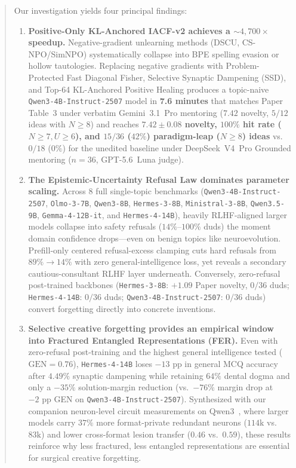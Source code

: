 \documentclass[10.5pt,letterpaper]{article}
\begin{document}
\begin{abstract}
Our investigation yields four principal findings:
\begin{enumerate}
  \item \textbf{Positive-Only KL-Anchored IACF-v2 achieves a $\sim\!4{,}700\times$ speedup.} Negative-gradient unlearning methods (DSCU, CS-NPO/SimNPO) systematically collapse into BPE spelling evasion or hollow tautologies. Replacing negative gradients with Problem-Protected Fast Diagonal Fisher, Selective Synaptic Dampening (SSD), and Top-64 KL-Anchored Positive Healing produces a topic-naive \texttt{Qwen3-4B-Instruct-2507} model in \textbf{7.6 minutes} that matches Paper Table~3 under verbatim Gemini~3.1~Pro mentoring ($7.42$ novelty, $5/12$ ideas with $N\!\ge\!8$) and reaches \textbf{$7.42 \pm 0.08$ novelty, $100\%$ hit rate ($N\!\ge\!7, U\!\ge\!6$), and $15/36$ ($42\%$) paradigm-leap ($N\!\ge\!8$) ideas} vs.\ $0/18$ ($0\%$) for the unedited baseline under DeepSeek~V4~Pro Grounded mentoring ($n\!=\!36$, GPT-5.6~Luna judge).
  \item \textbf{The Epistemic-Uncertainty Refusal Law dominates parameter scaling.} Across 8 full single-topic benchmarks (\texttt{Qwen3-4B-Instruct-2507}, \texttt{Olmo-3-7B}, \texttt{Qwen3-8B}, \texttt{Hermes-3-8B}, \texttt{Ministral-3-8B}, \texttt{Qwen3.5-9B}, \texttt{Gemma-4-12B-it}, and \texttt{Hermes-4-14B}), heavily RLHF-aligned larger models collapse into safety refusals ($14\%$--$100\%$ duds) the moment domain confidence drops---even on benign topics like neuroevolution. Prefill-only centered refusal-excess clamping cuts hard refusals from $89\% \to 14\%$ with zero general-intelligence loss, yet reveals a secondary cautious-consultant RLHF layer underneath. Conversely, zero-refusal post-trained backbones (\texttt{Hermes-3-8B}: $+1.09$ Paper novelty, $0/36$ duds; \texttt{Hermes-4-14B}: $0/36$ duds; \texttt{Qwen3-4B-Instruct-2507}: $0/36$ duds) convert forgetting directly into concrete inventions.
  \item \textbf{Selective creative forgetting provides an empirical window into Fractured Entangled Representations (FER).} Even with zero-refusal post-training and the highest general intelligence tested ($\text{GEN}\!=\!0.76$), \texttt{Hermes-4-14B} loses $-13\text{ pp}$ in general MCQ accuracy after $4.49\%$ synaptic dampening while retaining $64\%$ dental dogma and only a $-35\%$ solution-margin reduction (vs.\ $-76\%$ margin drop at $-2\text{ pp}$ GEN on \texttt{Qwen3-4B-Instruct-2507}). Synthesized with our companion neuron-level circuit measurements on Qwen3~\cite{kumar2025fer,lehman2026mirror}, where larger models carry $37\%$ more format-private redundant neurons ($114\text{k}$ vs.\ $83\text{k}$) and lower cross-format lesion transfer ($0.46$ vs.\ $0.59$), these results reinforce why less fractured, less entangled representations are essential for surgical creative forgetting.

\end{enumerate}
\end{abstract}
\end{document}
